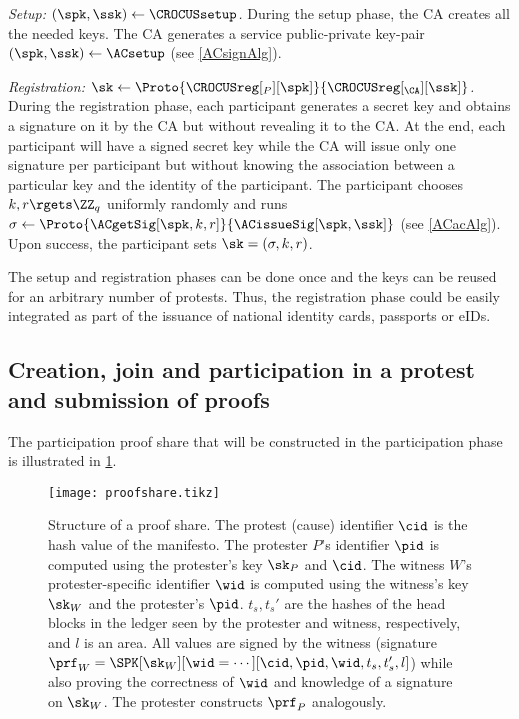 \emph{Setup: \((\spk, \ssk)\gets \CROCUSsetup\).}
During the setup phase, the \ac{CA} creates all the needed keys.
The \ac{CA} generates a service public-private key-pair \((\spk, \ssk)\gets 
  \ACsetup\) (see \cref{ACsignAlg}).

\emph{Registration: \(\sk\gets 
    \Proto{\CROCUSreg[_P][\spk]}{\CROCUSreg[_{\CA}][\ssk]}\).}
During the registration phase, each participant generates a secret key and 
obtains a signature on it by the \ac{CA} but without revealing it to the 
\ac{CA}.
At the end, each participant will have a signed secret key while the \ac{CA} 
will issue only one signature per participant but without knowing the 
association between a particular key and the identity of the participant.
The participant chooses \(k, r\rgets \ZZ_q\) uniformly randomly and runs 
\(\sigma \gets \Proto{\ACgetSig[\spk, k, r]}{\ACissueSig[\spk, \ssk]}\) (see 
\cref{ACacAlg}).
Upon success, the participant sets \(\sk = (\sigma, k, r)\).

The setup and registration phases can be done once and the keys can be reused 
for an arbitrary number of protests.
Thus, the registration phase could be easily integrated as part of the issuance 
of national identity cards, passports or \acp{eID}.

\subsection{Creation, join and participation in a protest and submission of proofs}%
\label{ProtocolDuring}



The participation proof share that will be constructed in the
participation phase is illustrated in \cref{fig:ProofFig}.

\begin{figure}
  \centering
  \small
  \texttt{[image: proofshare.tikz]}
  \caption{%
    Structure of a proof share.
    The protest (cause) identifier \(\cid\) is the hash value of the manifesto.
    The protester \(P\)'s identifier \(\pid\) is computed using the protester's key \(\sk_P\) and \(\cid\).
    The witness \(W\)'s protester-specific identifier \(\wid\) is computed using the
    witness's key \(\sk_W\) and the protester's \(\pid\).
    \(t_s, t_s'\) are the hashes of the head blocks in the ledger seen by the 
    protester and witness, respectively, and \(l\) is an area.
    All values are signed by the witness (signature \(\prf_W = \SPK[\sk_W][\wid 
      = \dotsb][\cid, \pid, \wid, t_s, t_s', l]\)) while also proving the 
    correctness of \(\wid\) and knowledge of a signature on \(\sk_W\).
    The protester constructs \(\prf_P\) analogously.
  }%
  \label{fig:ProofFig}
\end{figure}%


